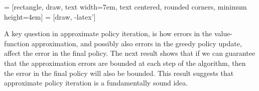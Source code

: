 \vspace{20pt}
 = [rectangle, draw,
    text width=7em, text centered, rounded corners, minimum height=4em]
 = [draw, -latex']
\vspace{20pt}

A key question in approximate policy iteration, is how errors in the value-function approximation, and possibly also errors in the greedy policy update, affect the error in the final policy. The next result shows that if we can guarantee that the approximation errors are bounded at each step of the algorithm, then the error in the final policy will also be bounded. This result suggests that approximate policy iteration is a fundamentally sound idea.

